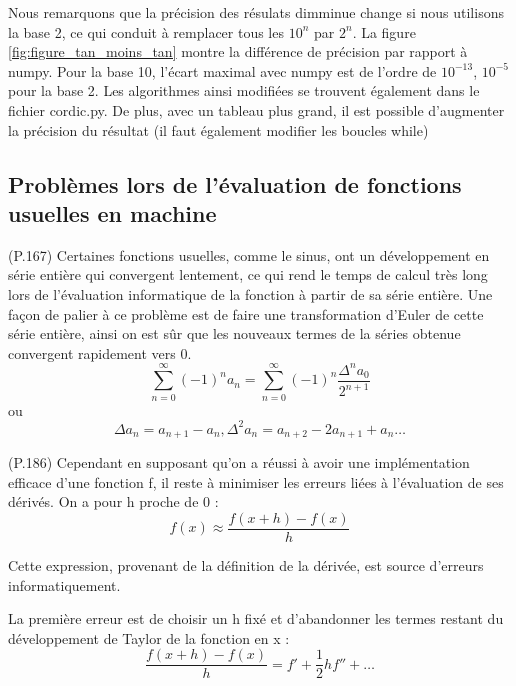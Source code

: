 \documentclass{article}
\def\cordicPythonFile{cordic.py}
\begin{document}
Nous remarquons que la précision des résulats dimminue change si nous utilisons la base 2, ce qui conduit à remplacer tous les $10^n$ par $2^n$. La figure \ref{fig:figure_tan_moins_tan} montre la différence de précision par rapport à numpy. Pour la base 10, l'écart maximal avec numpy est de l'ordre de $10^{-13}$, $10^{-5}$ pour la base 2. Les algorithmes ainsi modifiées se trouvent également dans le fichier \cordicPythonFile. De plus, avec un tableau plus grand, il est possible d'augmenter la précision du résultat (il faut également modifier les boucles while)

\subsection*{Problèmes lors de l’évaluation de fonctions usuelles en machine}

(P.167) Certaines fonctions usuelles, comme le sinus, ont un développement en série entière qui convergent lentement, ce qui rend le temps de calcul très long lors de l'évaluation informatique de la fonction à partir de sa série entière. Une façon de palier à ce problème est de faire une transformation d'Euler de cette série entière, ainsi on est sûr que les nouveaux termes de la séries obtenue convergent rapidement vers 0.\\
\begin{equation}
    \sum_{n=0}^\infty (-1)^n a_n = \sum_{n=0}^\infty (-1)^n \frac {\Delta^n a_0} {2^{n+1}}
    \label{eq:Euler_Transfo}
\end{equation}
ou
\begin{equation}
    \Delta a_n=a_{n+1}-a_n,\Delta^2 a_n=a_{n+2}-2a_{n+1}+a_n \dots
    \label{eq:Euler_Transfo_2}
\end{equation}

(P.186) Cependant en supposant  qu'on a réussi à avoir une implémentation efficace d'une fonction f, il reste à minimiser les erreurs liées à l'évaluation de ses dérivés. On a pour h proche de 0 : 
\begin{equation}
    f(x)\approx\frac{f(x+h)-f(x)}{h}
    \label{eq:derivee}
\end{equation}

Cette expression, provenant de la définition de la dérivée, est source d'erreurs informatiquement.

La première erreur est de choisir un h fixé et d’abandonner les termes restant du développement de Taylor de la fonction en x :
\begin{equation}
    \frac{f(x+h)-f(x)}{h}=f'+\frac{1}{2}hf''+ \dots
    \label{eq:developpement_de_Taylor}
\end{equation}
\end{document}
